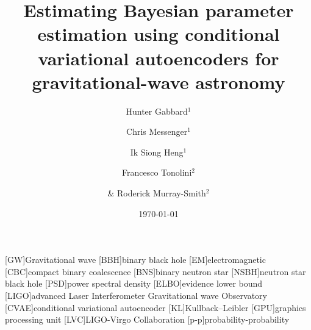 \documentclass[%
showpacs,
 amsmath,amssymb,
 aps,
 twocolumn,
 prl,
 reprint,
floatfix,
]{revtex4-1}
\begin{document}

\title{Estimating Bayesian parameter estimation using conditional variational
autoencoders for gravitational-wave astronomy}

\author{Hunter Gabbard$^1$}
\author{Chris Messenger$^1$}
\author{Ik Siong Heng$^1$}
\author{Francesco Tonolini$^2$}
\author{\& Roderick Murray-Smith$^2$}


\date{\today}

\maketitle

%

[GW]{Gravitational wave}
[BBH]{binary black hole}
[EM]{electromagnetic}
[CBC]{compact binary coalescence}
[BNS]{binary neutron star}
[NSBH]{neutron star black hole}
[PSD]{power spectral density}
[ELBO]{evidence lower bound}
[LIGO]{advanced Laser Interferometer Gravitational wave Observatory}
[CVAE]{conditional variational autoencoder}
[KL]{Kullback–Leibler}
[GPU]{graphics processing unit}
[LVC]{LIGO-Virgo Collaboration}
[p-p]{probability-probability}
\end{document}
